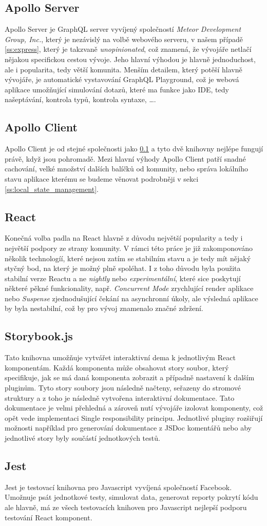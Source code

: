 \subsection{Apollo Server}
\label{ss:apollo_server}
Apollo Server je GraphQL server vyvíjený společností \emph{Meteor Development Group, Inc.}, který je nezávislý na volbě webového serveru, v našem případě \ref{ss:express}, který je takzvaně \emph{unopinionated}, což znamená, že vývojáře netlačí nějakou specifickou cestou vývoje. Jeho hlavní výhodou je hlavně jednoduchost, ale i popularita, tedy větší komunita. Menším detailem, který potěší hlavně vývojáře, je automatické vystavování GraphQL Playground, což je webová aplikace umožňující simulování dotazů, které ma funkce jako IDE, tedy našeptávání, kontrola typů, kontrola syntaxe, \ldots{}.

\subsection{Apollo Client}
\label{ss:apollo_client}
Apollo Client je od stejné společnosti jako \ref{ss:apollo_server} a tyto dvě knihovny nejlépe fungují právě, když jsou pohromadě. Mezi hlavní výhody Apollo Client patří snadné cachování, velké množství dalších balíčků od komunity, nebo správa lokálního stavu aplikace kterému se budeme věnovat podrobněji v sekci \ref{ss:local_state_management}.

\subsection{React}
\label{ss:react}
Konečná volba padla na React hlavně z důvodu největší popularity a tedy i největší podpory ze strany komunity. V rámci této práce je již zakomponováno několik technologíí, které nejsou zatím se stabilním stavu a je tedy mít nějaký styčný bod, na který je možný plně spoléhat. I z toho důvodu byla použita stabilní verze Reactu a ne \emph{nightly} nebo \emph{experimentální}, které sice poskytují některé pěkné funkcionality, např. \emph{Concurrent Mode} zrychlující render aplikace nebo \emph{Suspense} zjednodušující čekání na asynchronní úkoly, ale výsledná aplikace by byla nestabilní, což by pro vývoj znamenalo značné zdržení.


\subsection{Storybook.js}
\label{ss:storybook}
Tato knihovna umožňuje vytvářet interaktivní dema k jednotlivým React komponentám. Každá komponenta může obsahovat story soubor, který specifikuje, jak se má daná komponenta zobrazit a případně nastavení k dalším pluginům. Tyto story soubory jsou následně načteny, seřazeny do stromové struktury a z toho je následně vytvořena interaktivní dokumentace. Tato dokumentace je velmi přehledná a zároveň nutí vývojáře izolovat komponenty, což opět vede implementaci Single responsibility principu. Jednotlivé pluginy rozšiřují možnosti například pro generování dokumentace z JSDoc komentářů nebo aby jednotlivé story byly součástí jednotkových testů.

\subsection{Jest}
\label{ss:jest}
Jest je testovací knihovna pro Javascript vyvíjená společností Facebook. Umožnuje psát jednotkové testy, simulovat data, generovat reporty pokrytí kódu ale hlavně, má ze všech testovacích knihoven pro Javascript nejlepší podporu testování React komponent.

